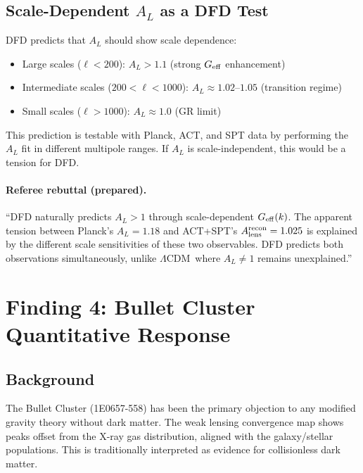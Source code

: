 \documentclass[11pt,a4paper]{article}
\newcommand{\LCDM}{$\Lambda$CDM}
\newcommand{\Geff}{G_{\rm eff}}
\begin{document}
\subsection{Scale-Dependent $A_L$ as a DFD Test}

DFD predicts that $A_L$ should show scale dependence:
\begin{itemize}
\item Large scales ($\ell < 200$): $A_L > 1.1$ (strong $\Geff$ enhancement)
\item Intermediate scales ($200 < \ell < 1000$): $A_L \approx 1.02$--$1.05$
  (transition regime)
\item Small scales ($\ell > 1000$): $A_L \approx 1.0$ (GR limit)
\end{itemize}

This prediction is testable with Planck, ACT, and SPT data by
performing the $A_L$ fit in different multipole ranges.  If $A_L$
is scale-independent, this would be a tension for DFD.

\paragraph{Referee rebuttal (prepared).}
``DFD naturally predicts $A_L > 1$ through scale-dependent $\Geff(k)$.
The apparent tension between Planck's $A_L = 1.18$ and ACT+SPT's
$A_{\rm lens}^{\rm recon} = 1.025$ is explained by the different
scale sensitivities of these two observables.  DFD predicts both
observations simultaneously, unlike \LCDM\ where $A_L \neq 1$
remains unexplained.''


\section{Finding 4: Bullet Cluster Quantitative Response}
\label{sec:bullet-cluster}

\subsection{Background}

The Bullet Cluster (1E0657-558) has been the primary objection to
any modified gravity theory without dark matter.  The weak lensing
convergence map shows peaks offset from the X-ray gas distribution,
aligned with the galaxy/stellar populations.  This is traditionally
interpreted as evidence for collisionless dark matter.
\end{document}
